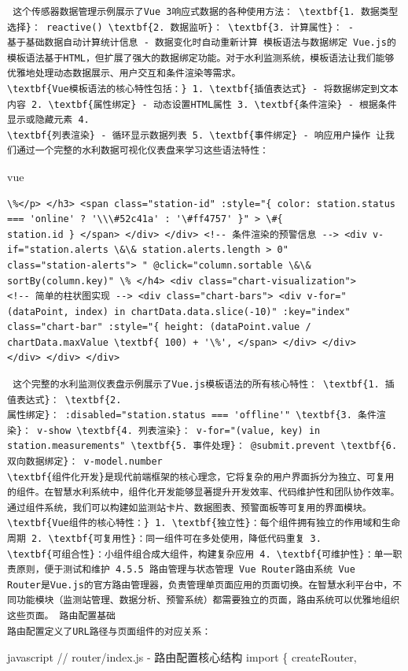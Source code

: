 \begin{lstlisting} 这个传感器数据管理示例展示了Vue 3响应式数据的各种使用方法： \textbf{1. 数据类型选择}： reactive() \textbf{2. 数据监听}： \textbf{3. 计算属性}： -
基于基础数据自动计算统计信息 - 数据变化时自动重新计算 模板语法与数据绑定 Vue.js的模板语法基于HTML，但扩展了强大的数据绑定功能。对于水利监测系统，模板语法让我们能够优雅地处理动态数据展示、用户交互和条件渲染等需求。
\textbf{Vue模板语法的核心特性包括：} 1. \textbf{插值表达式} - 将数据绑定到文本内容 2. \textbf{属性绑定} - 动态设置HTML属性 3. \textbf{条件渲染} - 根据条件显示或隐藏元素 4.
\textbf{列表渲染} - 循环显示数据列表 5. \textbf{事件绑定} - 响应用户操作 让我们通过一个完整的水利数据可视化仪表盘来学习这些语法特性： \end{lstlisting} vue \begin{verbatim}
\%</p> </h3> <span class="station-id" :style="{ color: station.status === 'online' ? '\\\#52c41a' : '\#ff4757' }" > \#{
station.id } </span> </div> </div> <!-- 条件渲染的预警信息 --> <div v-if="station.alerts \&\& station.alerts.length > 0"
class="station-alerts"> " @click="column.sortable \&\& sortBy(column.key)" \% </h4> <div class="chart-visualization">
<!-- 简单的柱状图实现 --> <div class="chart-bars"> <div v-for="(dataPoint, index) in chartData.data.slice(-10)" :key="index"
class="chart-bar" :style="{ height: (dataPoint.value / chartData.maxValue \textbf{ 100) + '\%', </span> </div> </div>
</div> </div> </div> \end{verbatim} \begin{lstlisting} 这个完整的水利监测仪表盘示例展示了Vue.js模板语法的所有核心特性： \textbf{1. 插值表达式}： \textbf{2.
属性绑定}： :disabled="station.status === 'offline'" \textbf{3. 条件渲染}： v-show \textbf{4. 列表渲染}： v-for="(value, key) in
station.measurements" \textbf{5. 事件处理}： @submit.prevent \textbf{6. 双向数据绑定}： v-model.number
\textbf{组件化开发}是现代前端框架的核心理念，它将复杂的用户界面拆分为独立、可复用的组件。在智慧水利系统中，组件化开发能够显著提升开发效率、代码维护性和团队协作效率。通过组件系统，我们可以构建如监测站卡片、数据图表、预警面板等可复用的界面模块。
\textbf{Vue组件的核心特性：} 1. \textbf{独立性}：每个组件拥有独立的作用域和生命周期 2. \textbf{可复用性}：同一组件可在多处使用，降低代码重复 3.
\textbf{可组合性}：小组件组合成大组件，构建复杂应用 4. \textbf{可维护性}：单一职责原则，便于测试和维护 4.5.5 路由管理与状态管理 Vue Router路由系统 Vue
Router是Vue.js的官方路由管理器，负责管理单页面应用的页面切换。在智慧水利平台中，不同功能模块（监测站管理、数据分析、预警系统）都需要独立的页面，路由系统可以优雅地组织这些页面。 路由配置基础
路由配置定义了URL路径与页面组件的对应关系： \end{lstlisting} javascript // router/index.js - 路由配置核心结构 import \{ createRouter,

